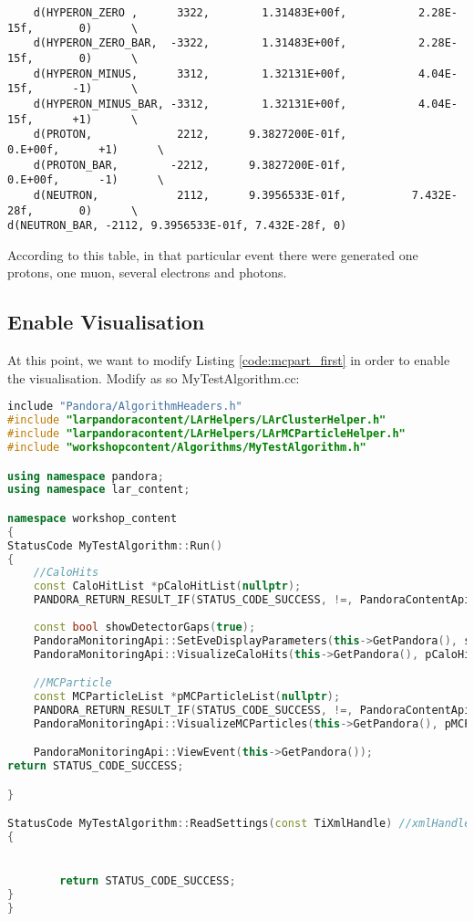 \begin{verbatim}
    d(HYPERON_ZERO ,      3322,        1.31483E+00f,           2.28E-15f,       0)      \
    d(HYPERON_ZERO_BAR,  -3322,        1.31483E+00f,           2.28E-15f,       0)      \
    d(HYPERON_MINUS,      3312,        1.32131E+00f,           4.04E-15f,      -1)      \
    d(HYPERON_MINUS_BAR, -3312,        1.32131E+00f,           4.04E-15f,      +1)      \
    d(PROTON,             2212,      9.3827200E-01f,             0.E+00f,      +1)      \
    d(PROTON_BAR,        -2212,      9.3827200E-01f,             0.E+00f,      -1)      \
    d(NEUTRON,            2112,      9.3956533E-01f,          7.432E-28f,       0)      \
d(NEUTRON_BAR, -2112, 9.3956533E-01f, 7.432E-28f, 0)
\end{verbatim}

According to this table, in that particular event there were generated one protons, one muon, several electrons and photons.
\subsection{Enable Visualisation} \label{sssec:mcparticle_list_vis}

At this point, we want to modify Listing \ref{code:mcpart_first} in order to enable the visualisation. Modify as so MyTestAlgorithm.cc:

\begin{lstlisting}[language=C++, label=code:mcparticle_vis, caption=MyTestAlgorithm.cc now enables visualisation of both CaloHits (blue) and MCParticles (red)]
include "Pandora/AlgorithmHeaders.h"
#include "larpandoracontent/LArHelpers/LArClusterHelper.h"
#include "larpandoracontent/LArHelpers/LArMCParticleHelper.h"
#include "workshopcontent/Algorithms/MyTestAlgorithm.h"

using namespace pandora;
using namespace lar_content;

namespace workshop_content
{
StatusCode MyTestAlgorithm::Run()
{
	//CaloHits
	const CaloHitList *pCaloHitList(nullptr);
	PANDORA_RETURN_RESULT_IF(STATUS_CODE_SUCCESS, !=, PandoraContentApi::GetCurrentList(*this, pCaloHitList));
	
	const bool showDetectorGaps(true);
	PandoraMonitoringApi::SetEveDisplayParameters(this->GetPandora(), showDetectorGaps, DETECTOR_VIEW_XZ, -1.f, -1.f, 1.f);
	PandoraMonitoringApi::VisualizeCaloHits(this->GetPandora(), pCaloHitList, "CurrentCaloHits", BLUE);

	//MCParticle
	const MCParticleList *pMCParticleList(nullptr);
	PANDORA_RETURN_RESULT_IF(STATUS_CODE_SUCCESS, !=, PandoraContentApi::GetCurrentList(*this, pMCParticleList));
	PandoraMonitoringApi::VisualizeMCParticles(this->GetPandora(), pMCParticleList, "CurrentMCParticles", RED);

	PandoraMonitoringApi::ViewEvent(this->GetPandora());
return STATUS_CODE_SUCCESS;

}

StatusCode MyTestAlgorithm::ReadSettings(const TiXmlHandle) //xmlHandle)
{


        return STATUS_CODE_SUCCESS;
}
}
\end{lstlisting}

